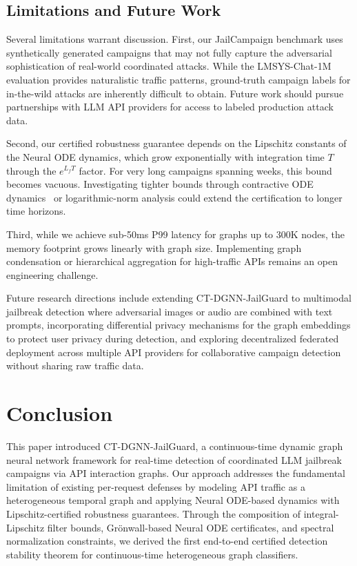 \documentclass[journal]{IEEEtran}
\theoremstyle{plain}
\theoremstyle{definition}
\theoremstyle{remark}
\begin{document}
\subsection{Limitations and Future Work}

Several limitations warrant discussion. First, our JailCampaign benchmark uses synthetically generated campaigns that may not fully capture the adversarial sophistication of real-world coordinated attacks. While the LMSYS-Chat-1M evaluation provides naturalistic traffic patterns, ground-truth campaign labels for in-the-wild attacks are inherently difficult to obtain. Future work should pursue partnerships with LLM API providers for access to labeled production attack data.

Second, our certified robustness guarantee depends on the Lipschitz constants of the Neural ODE dynamics, which grow exponentially with integration time $T$ through the $e^{L_f T}$ factor. For very long campaigns spanning weeks, this bound becomes vacuous. Investigating tighter bounds through contractive ODE dynamics~\cite{ayinde2023orthoode} or logarithmic-norm analysis could extend the certification to longer time horizons.

Third, while we achieve sub-50ms P99 latency for graphs up to 300K nodes, the memory footprint grows linearly with graph size. Implementing graph condensation or hierarchical aggregation for high-traffic APIs remains an open engineering challenge.

Future research directions include extending CT-DGNN-JailGuard to multimodal jailbreak detection where adversarial images or audio are combined with text prompts, incorporating differential privacy mechanisms for the graph embeddings to protect user privacy during detection, and exploring decentralized federated deployment across multiple API providers for collaborative campaign detection without sharing raw traffic data.

\section{Conclusion}
\label{sec:conclusion}

This paper introduced CT-DGNN-JailGuard, a continuous-time dynamic graph neural network framework for real-time detection of coordinated LLM jailbreak campaigns via API interaction graphs. Our approach addresses the fundamental limitation of existing per-request defenses by modeling API traffic as a heterogeneous temporal graph and applying Neural ODE-based dynamics with Lipschitz-certified robustness guarantees. Through the composition of integral-Lipschitz filter bounds, Gr\"onwall-based Neural ODE certificates, and spectral normalization constraints, we derived the first end-to-end certified detection stability theorem for continuous-time heterogeneous graph classifiers.
\end{document}
